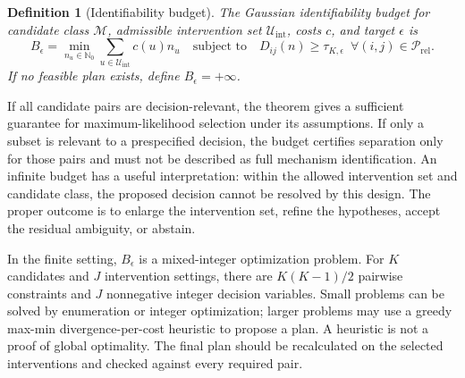 \documentclass[11pt]{article}
\newtheorem{definition}{Definition}[section]
\newcommand{\Mcal}{\mathcal{M}}
\newcommand{\Ucal}{\mathcal{U}}
\begin{document}
\begin{definition}[Identifiability budget]
The Gaussian identifiability budget for candidate class $\Mcal$, admissible intervention set $\Ucal_{\mathrm{int}}$, costs $c$, and target $\epsilon$ is
\begin{equation}
B_\epsilon=\min_{n_u\in\mathbb{N}_0}\sum_{u\in\Ucal_{\mathrm{int}}}c(u)n_u
\quad\text{subject to}\quad D_{ij}(n)\geq\tau_{K,\epsilon}\;\ \forall(i,j)\in\mathcal{P}_{\mathrm{rel}}.
\end{equation}
If no feasible plan exists, define $B_\epsilon=+\infty$.
\end{definition}

If all candidate pairs are decision-relevant, the theorem gives a sufficient guarantee for maximum-likelihood selection under its assumptions. If only a subset is relevant to a prespecified decision, the budget certifies separation only for those pairs and must not be described as full mechanism identification. An infinite budget has a useful interpretation: within the allowed intervention set and candidate class, the proposed decision cannot be resolved by this design. The proper outcome is to enlarge the intervention set, refine the hypotheses, accept the residual ambiguity, or abstain.

In the finite setting, $B_\epsilon$ is a mixed-integer optimization problem. For $K$ candidates and $J$ intervention settings, there are $K(K-1)/2$ pairwise constraints and $J$ nonnegative integer decision variables. Small problems can be solved by enumeration or integer optimization; larger problems may use a greedy max-min divergence-per-cost heuristic to propose a plan. A heuristic is not a proof of global optimality. The final plan should be recalculated on the selected interventions and checked against every required pair.
\end{document}
